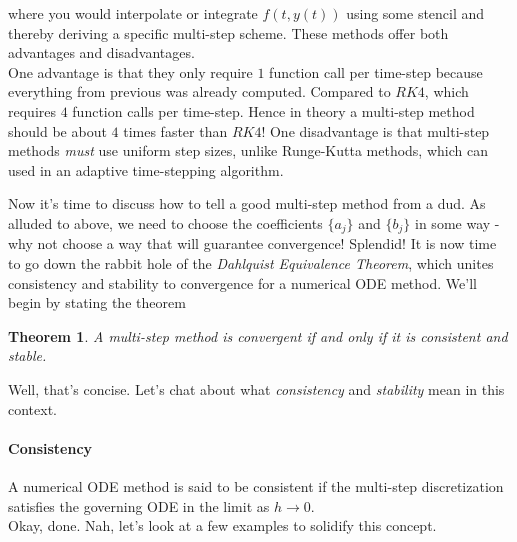 \documentclass[paper=a4, fontsize=11pt]{scrartcl} %
\newtheorem{theorem}{Theorem}
\numberwithin{equation}{section} %
\numberwithin{figure}{section} %
\numberwithin{table}{section} %
\begin{document}
where you would interpolate or integrate $f(t,y(t))$ using some stencil and thereby deriving a specific multi-step scheme. These methods offer both advantages and disadvantages.\\

One advantage is that they only require $1$ function call per time-step because everything from previous was already computed. Compared to $RK4$, which requires $4$ function calls per time-step. Hence in theory a multi-step method should be about $4$ times faster than $RK4$! One disadvantage is that multi-step methods \emph{must} use uniform step sizes, unlike Runge-Kutta methods, which can used in an adaptive time-stepping algorithm.

Now it's time to discuss how to tell a good multi-step method from a dud. As alluded to above, we need to choose the coefficients $\{a_{j}\}$ and $\{b_j\}$ in some way - why not choose a way that will guarantee convergence! Splendid! It is now time to go down the rabbit hole of the \emph{Dahlquist Equivalence Theorem}, which unites consistency and stability  to convergence for a numerical ODE method. We'll begin by stating the theorem

\begin{theorem}
A multi-step method is convergent if and only if it is consistent and stable.
\end{theorem}

Well, that's concise. Let's chat about what \emph{consistency} and \emph{stability} mean in this context.

\paragraph{Consistency}  A numerical ODE method is said to be consistent if the multi-step discretization satisfies the governing ODE in the limit as $h\rightarrow 0$.\\

Okay, done. Nah, let's look at a few examples to solidify this concept.
\end{document}
